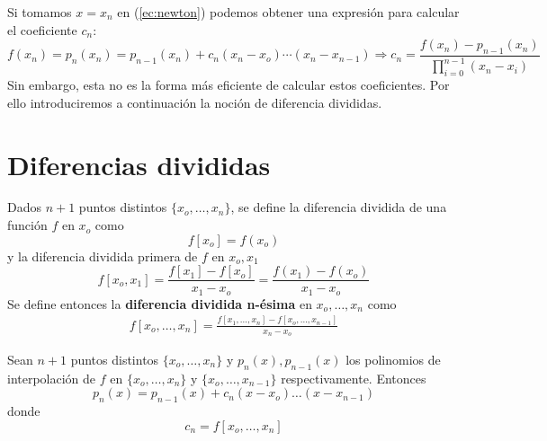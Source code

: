         \begin{cor}
        Si tomamos $x=x_n$ en (\ref{ec:newton}) podemos obtener una expresión para calcular el coeficiente $c_n$:
        $$f(x_n)=p_n(x_n)=p_{n-1}(x_n)+c_n(x_n-x_o)\cdots(x_n-x_{n-1})\Longrightarrow c_n=\frac{f(x_n)-p_{n-1}(x_n)}{\prod_{i=0}^{n-1}(x_n-x_i)}$$
        Sin embargo, esta no es la forma más eficiente de calcular estos coeficientes. Por ello introduciremos a continuación la noción de diferencia divididas.
        
        \end{cor}

        \section{Diferencias divididas}
        \begin{defin}
        Dados $n+1$ puntos distintos $\{x_o,\ldots,x_n\}$, se define la diferencia dividida de una función $f$ en $x_o$ como
        $$f[x_o]=f(x_o)$$
        y la diferencia dividida primera de $f$ en $x_o,x_1$ 
        $$f[x_o,x_1]=\frac{f[x_1]-f[x_o]}{x_1-x_o}=\frac{f(x_1)-f(x_o)}{x_1-x_o}$$
        Se define entonces la \textbf{diferencia dividida n-ésima} en $x_o,\ldots,x_n$ como
        \begin{align}
        f[x_o,\ldots,x_n]=\frac{f[x_1,\ldots,x_n]-f[x_o,\ldots,x_{n-1}]}{x_n-x_o} 
        \label{dif:div}
        \end{align}
        \end{defin}
        \begin{prop}
         Sean $n+1$ puntos distintos $\{x_o,\ldots,x_n\}$ y $p_n(x),p_{n-1}(x)$ los polinomios de interpolación de $f$ en $\{x_o,\ldots,x_n\}$ y $\{x_o,\ldots,x_{n-1}\}$ respectivamente. Entonces
         $$p_n(x)=p_{n-1}(x)+c_n(x-x_o)\ldots(x-x_{n-1})$$
         donde
         $$c_n=f[x_o,\ldots,x_n]$$
        \end{prop}
